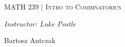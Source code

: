 \documentclass[10]{article}
\begin{document}
\begin{titlepage}
\begin{center}
\begin{LARGE}
\vspace*{3in}
\textsc{MATH 239 | Intro to Combinatorics}
\end{LARGE}
\end{center}
\begin{center}
\begin{large}
\textit{Instructor: Luke Postle} \\
\end{large}
\vspace{0.3cm}
Bartosz Antczak
\end{center}
\end{titlepage}
\end{document}
